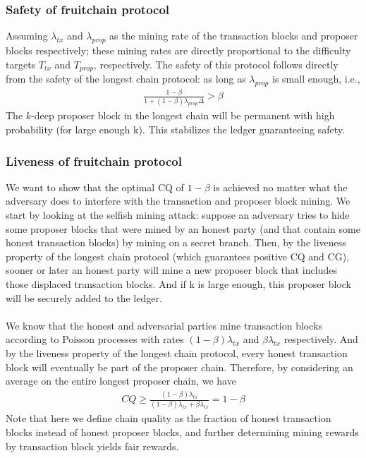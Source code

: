 \subsubsection{Safety of fruitchain protocol}
Assuming $\lambda_{tx}$ and $\lambda_{prop}$ as the mining rate of the transaction blocks and proposer blocks respectively;
these mining rates are directly proportional to the difficulty targets $T_{tx}$ and $T_{prop}$, respectively.
The safety of this protocol follows directly from the safety of the longest chain protocol: as long as
$\lambda_{prop}$ is small enough, i.e.,
\begin{align*}
    \frac{1-\beta}{1+(1-\beta)\lambda_{prop}\Delta} > \beta
\end{align*}
The $k$-deep proposer block in the longest chain will be permanent with high probability (for large
enough k). This stabilizes the ledger guaranteeing safety.
\subsubsection{Liveness of fruitchain protocol}
We want to show that the optimal CQ of $1 − \beta$ is achieved no matter what the adversary does to interfere with the transaction and proposer block mining. We start by looking at the selfish mining attack: suppose an adversary tries to hide some proposer blocks that were mined by an honest party (and that contain some honest transaction blocks) by mining on a secret branch. Then, by the liveness property of the longest chain protocol (which guarantees positive CQ and CG), sooner or later an honest party will mine a new proposer block that includes those displaced transaction blocks. And if k is large enough, this proposer block will be securely added to the ledger.\\\\
We know that the honest and adversarial parties mine transaction blocks according to Poisson processes with rates $(1 − \beta)\lambda_{tx}$ and $\beta\lambda_{tx}$ respectively. And by the liveness property of the longest chain protocol, every honest transaction block will eventually be part of the proposer chain. Therefore, by considering an average on the entire longest proposer chain, we have
\begin{align*}
    CQ \ge \frac{(1-\beta)\lambda_{tx}}{(1-\beta)\lambda_{tx} + \beta\lambda_{tx}} = 1 - \beta
\end{align*}
Note that here we define chain quality as the fraction of honest transaction blocks instead of honest proposer blocks, and further determining mining rewards by transaction block yields fair rewards.

